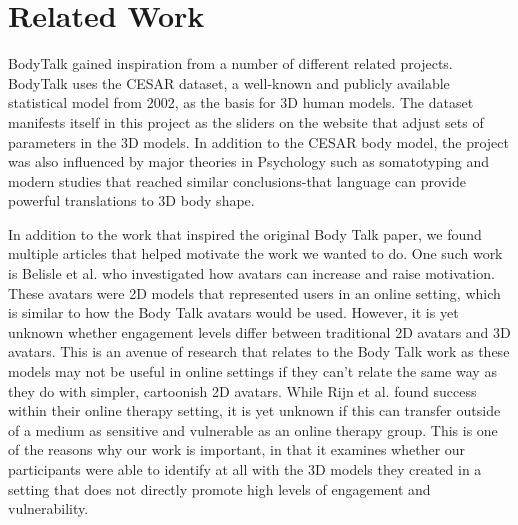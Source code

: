 \documentclass[journal]{vgtc}                %
\begin{document}
\section{Related Work}
\noindent BodyTalk gained inspiration from a number of different related projects. BodyTalk uses the CESAR dataset, a well-known and publicly available statistical model from 2002, as the basis for 3D human models. The dataset manifests itself in this project as the sliders on the website that adjust sets of parameters in the 3D models. In addition to the CESAR body model, the project was also influenced by major theories in Psychology such as somatotyping and modern studies that reached similar conclusions-that language can provide powerful translations to 3D body shape.\newline

\noindent In addition to the work that inspired the original Body Talk paper, we found multiple articles that helped motivate the work
we wanted to do. One such work is Belisle et al. who investigated how avatars can increase and raise motivation\cite{Belisle:2010:PM}.
These avatars were 2D models that represented users in an online setting, which is similar to how the Body Talk avatars would be used.
However, it is yet unknown whether engagement levels differ between traditional 2D avatars and 3D avatars. This is an avenue of research
that relates to the Body Talk work as these models may not be useful in online settings if they can't relate the same way as they
do with simpler, cartoonish 2D avatars. While Rijn et al. found success within their online therapy setting, it is yet
unknown if this can transfer outside of a medium as sensitive and vulnerable as an online therapy group\cite{Rijn:2015:BJGC}.
This is one of the reasons why our work is important, in that it examines whether
our participants were able to identify at all with the 3D models they created in a setting that does not directly promote
high levels of engagement and vulnerability.
\end{document}
